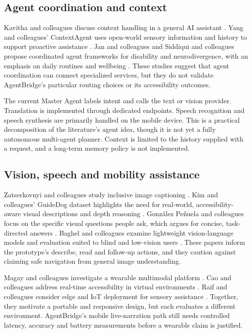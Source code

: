 \documentclass[12pt,a4paper,oneside]{report}
\begin{document}
\subsection{Agent coordination and context}
Kavitha and colleagues discuss context handling in a general AI assistant \cite{kavitha}. Yang and colleagues' ContextAgent uses open-world sensory information and history to support proactive assistance \cite{yang}. Jan and colleagues and Siddiqui and colleagues propose coordinated agent frameworks for disability and neurodivergence, with an emphasis on daily routines and wellbeing \cite{jan,siddiqui}. These studies suggest that agent coordination can connect specialized services, but they do not validate AgentBridge's particular routing choices or its accessibility outcomes.

The current Master Agent labels intent and calls the text or vision provider. Translation is implemented through dedicated endpoints. Speech recognition and speech synthesis are primarily handled on the mobile device. This is a practical decomposition of the literature's agent idea, though it is not yet a fully autonomous multi-agent planner. Context is limited to the history supplied with a request, and a long-term memory policy is not implemented.

\subsection{Vision, speech and mobility assistance}
Zatserkovnyi and colleagues study inclusive image captioning \cite{zatserkovnyi}. Kim and colleagues' GuideDog dataset highlights the need for real-world, accessibility-aware visual descriptions and depth reasoning \cite{kim}. Gonz\'alez Pe\~nuela and colleagues focus on the specific visual questions people ask, which argues for concise, task-directed answers \cite{penuela}. Baghel and colleagues examine lightweight vision-language models and evaluation suited to blind and low-vision users \cite{baghel}. These papers inform the prototype's describe, read and follow-up actions, and they caution against claiming safe navigation from general image understanding.

Magay and colleagues investigate a wearable multimodal platform \cite{magay}. Cao and colleagues address real-time accessibility in virtual environments \cite{cao}. Raif and colleagues consider edge and IoT deployment for sensory assistance \cite{raif}. Together, they motivate a portable and responsive design, but each evaluates a different environment. AgentBridge's mobile live-narration path still needs controlled latency, accuracy and battery measurements before a wearable claim is justified.
\end{document}
